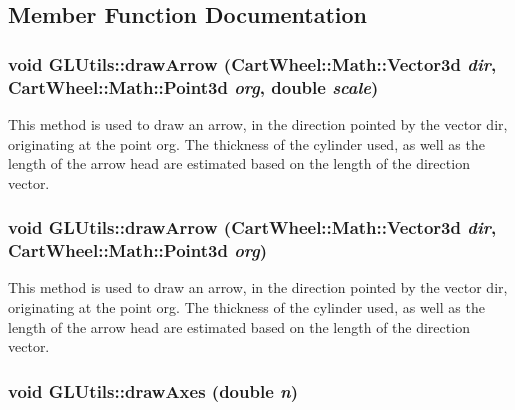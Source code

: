 \subsection{Member Function Documentation}
\hypertarget{classCartWheel_1_1GL_1_1GLUtils_aef19ec5684b19b50fad9944b2ba4d490}{
\subsubsection[{drawArrow}]{\setlength{\rightskip}{0pt plus 5cm}void GLUtils::drawArrow ({\bf CartWheel::Math::Vector3d} {\em dir}, \/  {\bf CartWheel::Math::Point3d} {\em org}, \/  double {\em scale})}}
\label{classCartWheel_1_1GL_1_1GLUtils_aef19ec5684b19b50fad9944b2ba4d490}
This method is used to draw an arrow, in the direction pointed by the vector dir, originating at the point org. The thickness of the cylinder used, as well as the length of the arrow head are estimated based on the length of the direction vector. \hypertarget{classCartWheel_1_1GL_1_1GLUtils_a68b05f7e87ec35561d823ac468a39955}{
\subsubsection[{drawArrow}]{\setlength{\rightskip}{0pt plus 5cm}void GLUtils::drawArrow ({\bf CartWheel::Math::Vector3d} {\em dir}, \/  {\bf CartWheel::Math::Point3d} {\em org})}}
\label{classCartWheel_1_1GL_1_1GLUtils_a68b05f7e87ec35561d823ac468a39955}
This method is used to draw an arrow, in the direction pointed by the vector dir, originating at the point org. The thickness of the cylinder used, as well as the length of the arrow head are estimated based on the length of the direction vector. \hypertarget{classCartWheel_1_1GL_1_1GLUtils_af963104ed3a61b0bff025f4e0f45f41b}{
\subsubsection[{drawAxes}]{\setlength{\rightskip}{0pt plus 5cm}void GLUtils::drawAxes (double {\em n})}}
